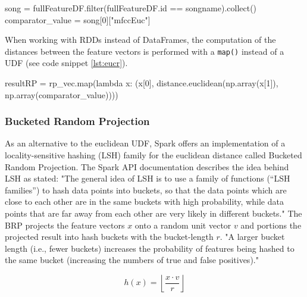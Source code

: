 \begin{pythonCode}[frame=single,label={lst:comp},caption={Filter for requested song},captionpos=b]
song = fullFeatureDF.filter(fullFeatureDF.id == songname).collect()
comparator_value = song[0]["mfccEuc"]
\end{pythonCode}

\noindent When working with RDDs instead of DataFrames, the computation of the distances between the feature vectors is performed with a \lstinline{map()} instead of a UDF (see code snippet \ref{lst:eucr}). 

\begin{pythonCode}[frame=single,label={lst:eucr},caption={euclidean distance RDD},captionpos=b]
resultRP = rp_vec.map(lambda x: (x[0], distance.euclidean(np.array(x[1]), np.array(comparator_value))))
\end{pythonCode}

\subsubsection{Bucketed Random Projection}

As an alternative to the euclidean UDF, Spark offers an implementation of a locality-sensitive hashing (LSH) family for the euclidean distance called Bucketed Random Projection. The Spark API documentation describes the idea behind LSH as stated: "The general idea of LSH is to use a family of functions (“LSH families”) to hash data points into buckets, so that the data points which are close to each other are in the same buckets with high probability, while data points that are far away from each other are very likely in different buckets." \cite{lshspark} The BRP projects the feature vectors $x$ onto a random unit vector $v$ and portions the projected result into hash buckets with the bucket-length $r$. "A larger bucket length (i.e., fewer buckets) increases the probability of features being hashed to the same bucket (increasing the numbers of true and false positives)." \cite{lshspark}

\begin{equation} \label{eq:brp}
h(x) = \left \lfloor{\frac{x \cdot v}{r}}\right \rfloor 
\end{equation}

